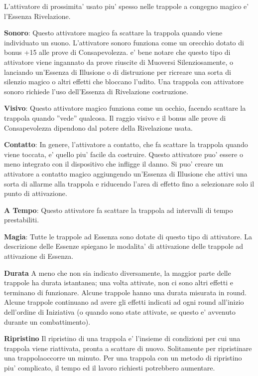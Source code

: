 \documentclass[a4paper,11pt,twoside,openany]{book}
\begin{document}
L'attivatore di prossimita' usato piu' spesso nelle trappole a congegno magico e' l'Essenza Rivelazione.

\textbf{Sonoro}: Questo attivatore magico fa scattare la trappola quando viene individuato un suono. L'attivatore sonoro funziona come un orecchio dotato di bonus +15 alle prove di Consapevolezza. e' bene notare che questo tipo di attivatore viene ingannato da prove riuscite di Muoversi Silenziosamente, o lanciando un'Essenza di Illusione o di distruzione per ricreare una sorta di silenzio magico o altri effetti che bloccano l'udito. Una trappola con attivatore sonoro richiede l'uso dell'Essenza di Rivelazione costruzione.

\textbf{Visivo}: Questo attivatore magico funziona come un occhio, facendo scattare la trappola quando ''vede'' qualcosa. Il raggio visivo e il bonus alle prove di Consapevolezza dipendono dal potere della Rivelazione usata.

\textbf{Contatto}: In genere, l'attivatore a contatto, che fa scattare la trappola quando viene toccata, e' quello piu' facile da costruire. Questo attivatore puo' essere o meno integrato con il dispositivo che infligge il danno. Si puo' creare un attivatore a contatto magico aggiungendo un'Essenza di Illusione che attivi una sorta di allarme alla trappola e riducendo l'area di effetto fino a selezionare solo il punto di attivazione.

\textbf{A Tempo}: Questo attivatore fa scattare la trappola ad intervalli di tempo prestabiliti.

\textbf{Magia}: Tutte le trappole ad Essenza sono dotate di questo tipo di attivatore. La descrizione delle Essenze spiegano le modalita' di attivazione delle trappole ad attivazione di Essenza. 

\textbf{Durata}
A meno che non sia indicato diversamente, la maggior parte delle trappole ha durata istantanea; una volta attivate, non ci sono altri effetti e terminano di funzionare. Alcune trappole hanno una durata misurata in round. Alcune trappole continuano ad avere gli effetti indicati ad ogni round all'inizio dell'ordine di Iniziativa (o quando sono state attivate, se questo e' avvenuto durante un combattimento).

\textbf{Ripristino}
Il ripristino di una trappola e' l'insieme di condizioni per cui una trappola viene riattivata, pronta a scattare di nuovo. Solitamente per ripristinare una trappolaoccorre un minuto. Per una trappola con un metodo di ripristino piu' complicato, il tempo ed il lavoro richiesti potrebbero aumentare.
\end{document}
